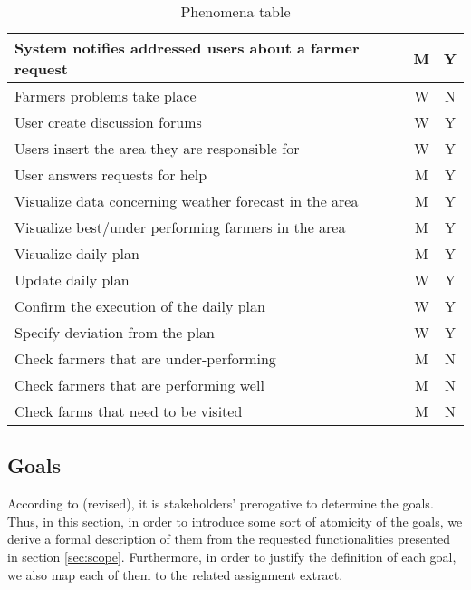 \begin{table}[H]
\begin{tabular}{|l|c|c|}
        \hline
        System notifies addressed users about a farmer request          &   M   &   Y \\
        \hline
        Farmers problems take place                                     &   W   &   N \\
        \hline
        User create discussion forums                                   &   W   &   Y \\
        \hline
        Users insert the area they are responsible for                  &   W   &   Y \\
        \hline
        User answers requests for help                                  &   M   &   Y \\
        \hline
        Visualize data concerning weather forecast in the area          &   M   &   Y \\
        \hline
        Visualize best/under performing farmers in the area             &   M   &   Y \\
        \hline
        Visualize daily plan                                            &   M   &   Y \\
        \hline
        Update daily plan                                               &   W   &   Y \\
        \hline
        Confirm the execution of the daily plan                         &   W   &   Y \\
        \hline
        Specify deviation from the plan                                 &   W   &   Y \\
        \hline
        Check farmers that are under-performing                         &   M   &   N \\
        \hline
        Check farmers that are performing well                          &   M   &   N \\
        \hline
        Check farms that need to be visited                             &   M   &   N \\
        \hline
    \end{tabular}
    
    \caption{\label{tab:phenomena_table}Phenomena table}
    
\end{table}

\newpage

\subsection{Goals}
\label{sec:goals}
According to \cite{jackson_dsfr} (revised), it is stakeholders' prerogative to determine the goals. Thus, in this section, in order to introduce some sort of atomicity of the goals, we derive a formal description of them from the requested functionalities presented in section \ref{sec:scope}. Furthermore, in order to justify the definition of each goal, we also map each of them to the related assignment extract.

